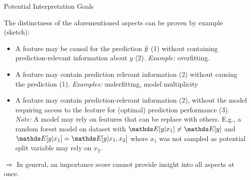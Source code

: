 \documentclass[11pt,compress,t,notes=noshow, xcolor=table]{beamer}
\begin{document}
\begin{vbframe}{Potential Interpretation Goals}

The distinctness of the aforementioned aspects can be proven by example (sketch):

\begin{itemize}
  \item A feature may be causal for the prediction $\yh$ (1) without containing prediction-relevant information about $y$ (2). \textit{Example:} overfitting.
  \item A feature may contain prediction relevant information (2) without causing the prediction (1).  \textit{Examples:} underfitting, model multiplicity
  \item A feature may contain prediction-relevant information (2), without the model requiring access to the feature for (optimal) prediction performance (3).\\
  \textit{Note:} A model may rely on features that can be replace with others. E.g., a random forest model on dataset with $\E[y|x_1] \neq \E[y]$ and $\E[y|x_1] = \E[y|x_1, x_2]$ where $x_1$ was not sampled as potential split variable may rely on $x_2$.
  \end{itemize}
$\Rightarrow$ In general, an importance score cannot provide insight into all aspects at once.
\end{vbframe}
\end{document}
